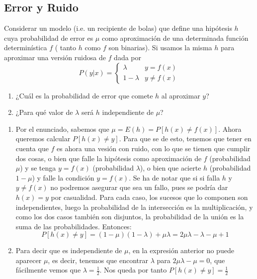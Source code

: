 \documentclass[11pt,leqno]{article}
\theoremstyle{definition}
\begin{document}
\subsection{Error y Ruido}
\begin{cuestion}
Considerar un modelo (i.e. un recipiente de bolas) que define una hipótesis $h$ cuya probabilidad de error es $\mu$ como aproximación de una determinada función determinística $f$ ( tanto $h$ como $f$ son binarias). Si usamos la misma $h$ para aproximar una versión ruidosa de $f$ dada por
\[ P( y|x) = 
\left\lbrace \begin{array}{ll}
 \lambda & y=f(x) \\
 1-\lambda & y \neq f(x) \end{array} \right.\]
\begin{enumerate}[a]
\item ¿Cuál es la probabilidad de error que comete $h$ al aproximar $y$?
\item ¿Para qué valor de $\lambda$ será $h$ independiente de $\mu$?
\end{enumerate}
\end{cuestion}

\begin{solucion}
\begin{enumerate}[a]
\item Por el enunciado, sabemos que $\mu = E(h) = P[ h(x)\neq f(x) ]$. Ahora queremos calcular $P[ h(x)\neq y ]$. Para que se de esto, tenemos que tener en cuenta que $f$ es ahora una vesión con ruido, con lo que se tienen que cumplir dos cosas, o bien que falle la hipótesis como aproximación de $f$ (probabilidad $\mu$) y se tenga $y=f(x)$ (probabilidad $\lambda$), o bien que acierte $h$ (probabilidad $1-\mu$) y falle la condición $y=f(x)$. Se ha de notar que si si falla $h$ y $y \neq f(x)$ no podremos asegurar que sea un fallo, pues se podría dar $h(x)=y$ por casualidad. Para cada caso, los sucesos que lo componen son independientes, luego la probabilidad de la intersección es la multiplicación, y como los dos casos también son disjuntos, la probabilidad de la unión es la suma de las probabilidades. Entonces:
\[ P[h(x) \neq y] = (1-\mu)(1-\lambda) + \mu \lambda = 2 \mu \lambda -\lambda - \mu + 1\]
\item Para decir que es independiente de $\mu$, en la expresión anterior no puede aparecer $\mu$, es decir, tenemos que encontrar $\lambda$ para $ 2 \mu \lambda - \mu = 0$, 
que fácilmente vemos que $\lambda = \frac{1}{2}$. Nos queda por tanto $ P[h(x) \neq y] = \frac{1}{2}$
\end{enumerate}
\end{solucion}
\end{document}
